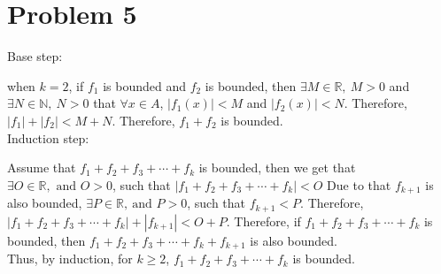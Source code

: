 \documentclass{article}
\begin{document}
\newpage
\section*{Problem 5}
    Base step: 

    when \(k=2\), if \(f_1\) is bounded and \(f_2\) is bounded, then \(\exists M\in \mathbb{R},\ M>0\) and \(\exists N\in \mathbb{N},\ N>0\)
    that \(\forall x\in A\), \(|f_1(x)|<M\) and \(|f_2(x)|<N\). Therefore, \(|f_1|+|f_2|<M+N\). Therefore, \(f_1+f_2\) is bounded.\\
    Induction step:

    Assume that \(f_1+f_2+f_3+\cdots +f_k\) is bounded, then we get that \\\(\exists O\in \mathbb{R}, \text{ and }O>0\), such that \(|f_1+f_2+f_3+\cdots +f_k|<O\)
    Due to that \(f_{k+1}\) is also bounded, \(\exists P\in \mathbb{R}, \ \text{and } P>0\), such that \(f_{k+1}<P\). Therefore, \(|f_1+f_2+f_3+\cdots +f_k|+|f_{k+1}|<O+P\).
    Therefore, if \(f_1+f_2+f_3+\cdots +f_k\) is bounded, then \(f_1+f_2+f_3+\cdots +f_k+f_{k+1}\) is also bounded. 
    \\
    Thus, by induction, for \(k\geqslant 2\), \(f_1+f_2+f_3+\cdots +f_k\) is bounded.



\end{document}
